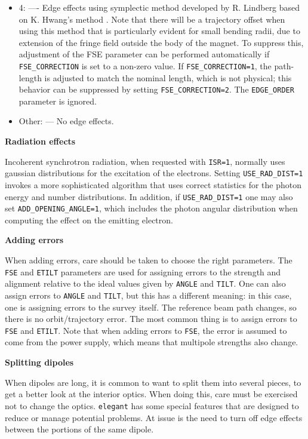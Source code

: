 \begin{itemize}
  \item 4: ---- Edge effects using symplectic method developed by R. Lindberg based on K. Hwang's method \cite{KHwang}.
  Note that there will be a trajectory offset when using this method that is particularly evident for small bending radii, due to
  extension of the fringe field outside the body of the magnet. To suppress this, adjustment of the FSE parameter can be performed automatically 
  if \verb|FSE_CORRECTION| is set to a non-zero value. If \verb|FSE_CORRECTION=1|, the path-length is adjusted to match the nominal
  length, which is not physical; this behavior can be suppressed by setting \verb|FSE_CORRECTION=2|.
  The \verb|EDGE_ORDER| parameter is ignored.
  \item Other: --- No edge effects.
\end{itemize}

{\bf Radiation effects}

Incoherent synchrotron radiation, when requested with {\tt ISR=1},
normally uses gaussian distributions for the excitation of the electrons.
Setting {\tt USE\_RAD\_DIST=1} invokes a more sophisticated algorithm that
uses correct statistics for the photon energy and number distributions.
In addition, if {\tt USE\_RAD\_DIST=1} one may also set {\tt ADD\_OPENING\_ANGLE=1},
which includes the photon angular distribution when computing the effect on 
the emitting electron.  

{\bf Adding errors}

When adding errors, care should be taken to choose the right
parameters.  The \verb|FSE| and \verb|ETILT| parameters are used for
assigning errors to the strength and alignment relative to the ideal
values given by \verb|ANGLE| and \verb|TILT|.  One can also assign 
errors to \verb|ANGLE| and \verb|TILT|, but this has a different meaning:
in this case, one is assigning errors to the survey itself.  The reference
beam path changes, so there is no orbit/trajectory error. The most common
thing is to assign errors to \verb|FSE| and \verb|ETILT|.  Note that when
adding errors to \verb|FSE|, the error is assumed to come from the power
supply, which means that multipole strengths also change.

{\bf Splitting dipoles}

When dipoles are long, it is
common to want to split them into several pieces, to get a better look
at the interior optics.  When doing this, care must be exercised not
to change the optics.  {\tt elegant} has some special features that
are designed to reduce or manage potential problems. At issue is the
need to turn off edge effects between the portions of the same dipole.

